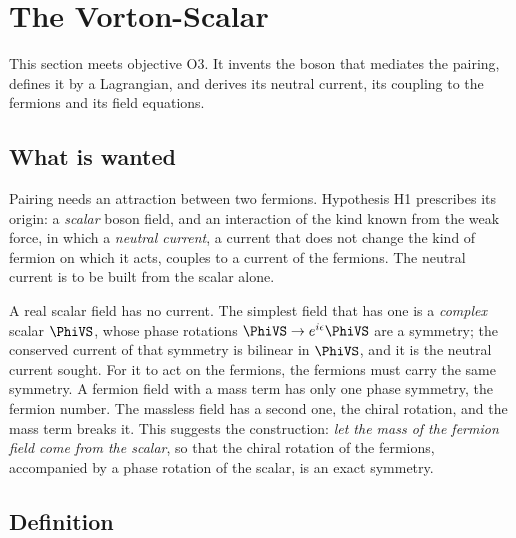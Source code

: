 
\section{The Vorton-Scalar}
\label{sec:vs}

This section meets objective O3. It invents the boson that mediates the pairing, defines it by a
Lagrangian, and derives its neutral current, its coupling to the fermions and its field equations.

\subsection{What is wanted}

Pairing needs an attraction between two fermions. Hypothesis H1 prescribes its origin: a \emph{scalar}
boson field, and an interaction of the kind known from the weak force, in which a \emph{neutral
current}, a current that does not change the kind of fermion on which it acts, couples to a current of
the fermions. The neutral current is to be built from the scalar alone.

A real scalar field has no current. The simplest field that has one is a \emph{complex} scalar
$\PhiVS$, whose phase rotations $\PhiVS\to e^{i\epsilon}\PhiVS$ are a symmetry; the conserved current
of that symmetry is bilinear in $\PhiVS$, and it is the neutral current sought. For it to act on the
fermions, the fermions must carry the same symmetry. A fermion field with a mass term has only one
phase symmetry, the fermion number. The massless field has a second one, the chiral rotation, and the
mass term breaks it. This suggests the construction: \emph{let the mass of the fermion field come
from the scalar}, so that the chiral rotation of the fermions, accompanied by a phase rotation of the
scalar, is an exact symmetry.

\subsection{Definition}
\label{sec:vsdef}

